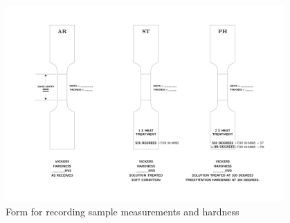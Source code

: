 \documentclass{article}
\begin{document}
\begin{figure}[H] 
    \centering 
    \includegraphics[width=0.95\textwidth,cfbox=gray!22 1pt]{figures/alloys_base.jpg} %
    \caption{Form for recording sample measurements and hardness} 
    \label{fig:alloys} 
\end{figure}
\end{document}
